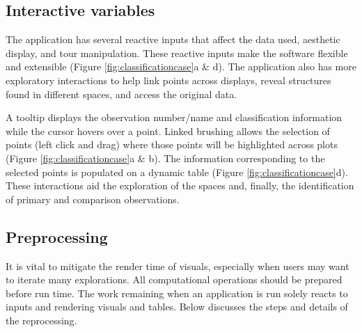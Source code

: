 \documentclass[
]{sn-jnl}
\begin{document}
\hypertarget{interactive-variables}{%
\subsection{Interactive variables}\label{interactive-variables}}

The application has several reactive inputs that affect the data used,
aesthetic display, and tour manipulation. These reactive inputs make the
software flexible and extensible (Figure \ref{fig:classificationcase}a
\& d). The application also has more exploratory interactions to help
link points across displays, reveal structures found in different
spaces, and access the original data.

A tooltip displays the observation number/name and classification
information while the cursor hovers over a point. Linked brushing allows
the selection of points (left click and drag) where those points will be
highlighted across plots (Figure \ref{fig:classificationcase}a \& b).
The information corresponding to the selected points is populated on a
dynamic table (Figure \ref{fig:classificationcase}d). These interactions
aid the exploration of the spaces and, finally, the identification of
primary and comparison observations.

\hypertarget{preprocessing}{%
\subsection{Preprocessing}\label{preprocessing}}

It is vital to mitigate the render time of visuals, especially when
users may want to iterate many explorations. All computational
operations should be prepared before run time. The work remaining when
an application is run solely reacts to inputs and rendering visuals and
tables. Below discusses the steps and details of the reprocessing.
\end{document}
